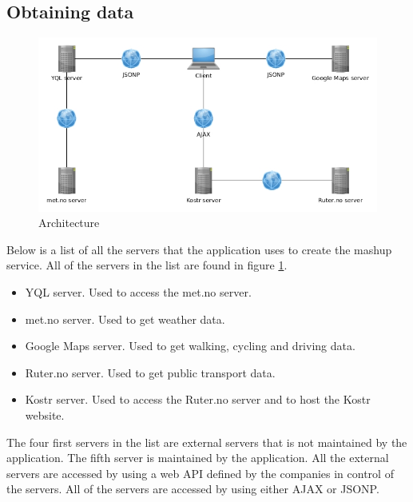 \documentclass[10pt,a4paper]{article}
\begin{document}
\subsection{Obtaining data}
\label{sec:architecture}



\begin{figure}
\centering
\includegraphics[width=\textwidth]{../arch/arch}
\caption{Architecture}
\label{fig:arch}
\end{figure}

Below is a list of all the servers that the application uses to create the mashup service. All of the servers in the list are found in figure \ref{fig:arch}.

\begin{itemize}
\item YQL server. Used to access the met.no server.\cite{yql}
\item met.no server. Used to get weather data.\cite{metno}
\item Google Maps server. Used to get walking, cycling and driving data.\cite{gmaps}
\item Ruter.no server. Used to get public transport data.\cite{ruter}
\item Kostr server. Used to access the Ruter.no server and to host the Kostr website.
\end{itemize}

The four first servers in the list are external servers that is not maintained by the application. The fifth server is maintained by the application. All the external servers are accessed by using a web API defined by the companies in control of the servers. All of the servers are accessed by using either AJAX or JSONP.
\end{document}
